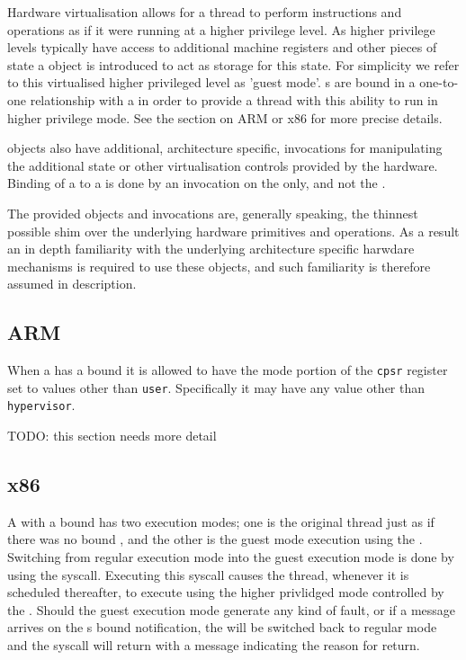 Hardware virtualisation allows for a thread to perform instructions and operations as if it were
running at a higher privilege level. As higher privilege levels typically have access to
additional machine registers and other pieces of state a  object is introduced to act
as storage for this state. For simplicity we refer to this virtualised higher privileged level as
'guest mode'. s are bound in a one-to-one relationship with a  in order
to provide a thread with this ability to run in higher privilege mode. See the section on
ARM or x86 for more precise details.

 objects also have additional, architecture specific, invocations for manipulating
the additional state or other virtualisation controls provided by the hardware. Binding of
a  to a  is done by an invocation on the  only, and not the .

The provided objects and invocations are, generally speaking, the thinnest possible shim over
the underlying hardware primitives and operations. As a result an in depth familiarity with
the underlying architecture specific harwdare mechanisms is required to use these objects, and
such familiarity is therefore assumed in description.

\subsection{ARM}

When a  has a bound  it is allowed to have the mode portion of the
\texttt{cpsr} register set to values other than \texttt{user}. Specifically it may have any value other than
\texttt{hypervisor}.

TODO: this section needs more detail

\subsection{x86}

A  with a bound  has two execution modes; one is the original thread just as
if there was no bound , and the other is the guest mode execution using the
. Switching from regular execution mode into the guest execution mode is
done by using the  syscall. Executing this syscall causes the thread, whenever
it is scheduled thereafter, to execute using the higher privlidged mode controlled by the .
Should the guest execution mode generate any kind of fault, or if a message arrives
on the s bound notification, the  will be switched back to regular mode
and the  syscall will return with a message indicating the reason for return.

